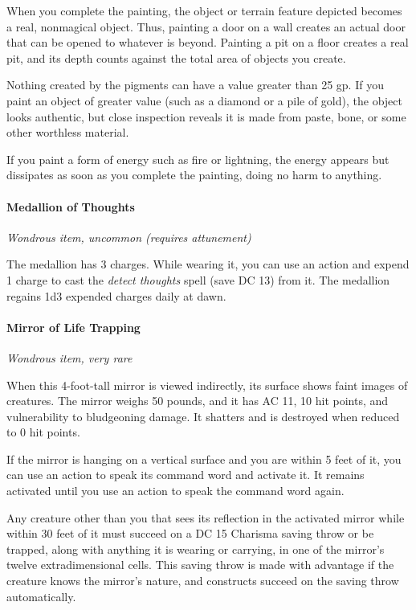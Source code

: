 \documentclass[
]{article}
\begin{document}
When you complete the painting, the object or terrain feature depicted
becomes a real, nonmagical object. Thus, painting a door on a wall
creates an actual door that can be opened to whatever is beyond.
Painting a pit on a floor creates a real pit, and its depth counts
against the total area of objects you create.

Nothing created by the pigments can have a value greater than 25 gp. If
you paint an object of greater value (such as a diamond or a pile of
gold), the object looks authentic, but close inspection reveals it is
made from paste, bone, or some other worthless material.

If you paint a form of energy such as fire or lightning, the energy
appears but dissipates as soon as you complete the painting, doing no
harm to anything.

\hypertarget{medallion-of-thoughts}{%
\paragraph{Medallion of Thoughts}\label{medallion-of-thoughts}}

\emph{Wondrous item, uncommon (requires attunement)}

The medallion has 3 charges. While wearing it, you can use an action and
expend 1 charge to cast the \emph{detect thoughts} spell (save DC 13)
from it. The medallion regains 1d3 expended charges daily at dawn.

\hypertarget{mirror-of-life-trapping}{%
\paragraph{Mirror of Life Trapping}\label{mirror-of-life-trapping}}

\emph{Wondrous item, very rare}

When this 4-foot-tall mirror is viewed indirectly, its surface shows
faint images of creatures. The mirror weighs 50 pounds, and it has AC
11, 10 hit points, and vulnerability to bludgeoning damage. It shatters
and is destroyed when reduced to 0 hit points.

If the mirror is hanging on a vertical surface and you are within 5 feet
of it, you can use an action to speak its command word and activate it.
It remains activated until you use an action to speak the command word
again.

Any creature other than you that sees its reflection in the activated
mirror while within 30 feet of it must succeed on a DC 15 Charisma
saving throw or be trapped, along with anything it is wearing or
carrying, in one of the mirror's twelve extradimensional cells. This
saving throw is made with advantage if the creature knows the mirror's
nature, and constructs succeed on the saving throw automatically.
\end{document}
